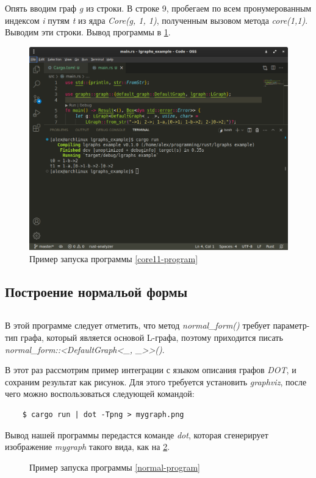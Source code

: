Опять вводим граф \emph{g} из строки. В строке 9, пробегаем по всем пронумерованным индексом \emph{i} путям \emph{t} 
из ядра \emph{Core(g, 1, 1)}, полученным вызовом метода \emph{core(1,1)}. 
Выводим эти строки. Вывод программы в \ref{core11-out-image}.

\begin{figure}
    \centering
    \includegraphics[scale=0.4]{static_images/install_step6.png}
    \caption{Пример запуска программы \ref{core11-program}}
    \label{core11-out-image}
\end{figure}

\subsection{Построение нормальой формы}
\inputminted[linenos]{rust}{../lgraphs/examples/normal.rs} \label{normal-program}

В этой программе следует отметить, что метод \emph{normal\_form()} требует параметр-тип графа, который является основой
L-графа, поэтому приходится писать \emph{normal\_form::<DefaultGraph<\_, \_>{}>()}.

В этот раз рассмотрим пример интеграции с языком описания графов \emph{DOT}, и сохраним результат как рисунок.
Для этого требуется установить \emph{graphviz}, после чего можно воспользоваться следующей командой:
\begin{verbatim}
    $ cargo run | dot -Tpng > mygraph.png
\end{verbatim}

Вывод нашей программы передастся команде \emph{dot}, которая сгенерирует изображение \emph{mygraph} такого вида,
как на \ref{normal-out-image}.

\begin{figure}[h]
    \centering
    
    \caption{Пример запуска программы \ref{normal-program}}
    \label{normal-out-image}
\end{figure}


\pagebreak